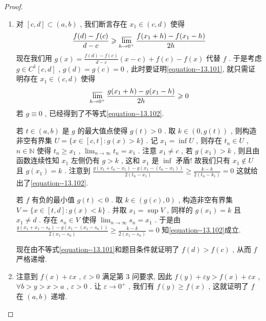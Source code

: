 \documentclass[../../main.tex]{subfiles}
\begin{document}
\begin{proof}
\begin{enumerate}
\item 对 \([c, d] \subset (a, b)\) , 我们断言存在 \(x_1 \in (c, d)\) 使得
\begin{align}
\frac{f(d) - f(c)}{d - c} \geqslant  \varlimsup_{h \to 0^+} \frac{f(x_1 + h) - f(x_1 - h)}{2h} \label{equation--13.101}
\end{align}
现在我们用 \(g(x) = \frac{f(d) - f(c)}{d - c}(x - c) + f(c) - f(x)\) 代替 \(f\) . 于是考虑 \(g \in C^1[c, d]\) , \(g(d) = g(c) = 0\) , 此时要证明\eqref{equation--13.101}, 就只需证明存在 \(x_1 \in (c, d)\) 使得
\begin{align}
\varlimsup_{h \to 0^+} \frac{g(x_1 + h) - g(x_1 - h)}{2h} \geqslant  0 \label{equation--13.102}
\end{align}
若 \(g \equiv 0\) , 已经得到了不等式\eqref{equation--13.102}.

若 \(t \in (a, b)\) 是 \(g\) 的最大值点使得 \(g(t) > 0\) . 取 \(k \in (0, g(t))\) , 则构造非空有界集
\(U = \{x \in [c, t] : g(x) > k\}\) .
记 \(x_1 = \inf U\) , 则存在 \(t_n \in U\) , \(n \in \mathbb{N}\) 使得
\(t_n \geqslant  x_1\) , \(\lim_{n \to \infty} t_n = x_1\) .
注意 \(x_1 \neq c\) , 若 \(g(x_1) > k\) , 则且由函数连续性知 \(x_1\) 左侧仍有 \(g > k\) , 这和 \(x_1\) 是 \(\inf\) 矛盾! 故我们只有 \(x_1 \notin U\) 且 \(g(x_1) = k\) . 注意到
\(\frac{g(x_1 + t_n - x_1) - g(x_1 - (t_n - x_1))}{2(t_n - x_1)} \geqslant  \frac{k - k}{2(t_n - k_1)} = 0\)
这就给出了\eqref{equation--13.102}.

若 \(f\) 有负的最小值 \(g(t) < 0\) . 取 \(k \in (g(c), 0)\) , 构造非空有界集
\(V = \{x \in [t, d] : g(x) < k\}\) .
并取 \(x_1 = \sup V\) , 同样的 \(g(x_1) = k\) 且 \(x_1 \neq d\) . 存在 \(s_n \in V\) 使得 \(\lim_{n \to \infty} s_n = x_1\) . 于是由
\(\frac{g(x_1 + x_1 - s_n) - g(x_1 - (x_1 - s_n))}{2(x_1 - s_n)} \geqslant  \frac{k - k}{2(x_1 - s_n)} = 0\)
知\eqref{equation--13.102}成立.

现在由不等式\eqref{equation--13.101}和题目条件就证明了 \(f(d) > f(c)\) , 从而 \(f\) 严格递增.

\item 注意到 \(f(x) + \varepsilon x\) , \(\varepsilon > 0\) 满足第 3 问要求, 因此
\(f(y) + \varepsilon y > f(x) + \varepsilon x\) , \(\forall b > y > x > a\) , \(\varepsilon > 0\) .
让 \(\varepsilon \to 0^+\) , 我们有 \(f(y) \geqslant  f(x)\) , 这就证明了 \(f\) 在 \((a, b)\) 递增. 
\end{enumerate}
\end{proof}
\end{document}
